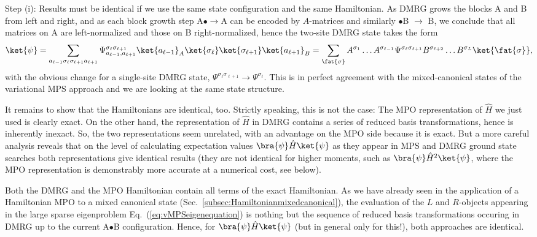 Step (i): Results must be identical if we use the same state configuration and the same Hamiltonian. As DMRG grows the blocks A and B from left and right, and as each block growth step A$\bullet \rightarrow$A can be encoded by $A$-matrices and similarly $\bullet$B $\rightarrow$ B, we conclude that all matrices on A are left-normalized and those on B right-normalized, hence the two-site DMRG state takes the form
\begin{equation}
\ket{\psi} = \sum_{a_{\ell-1} \sigma_\ell \sigma_{\ell+1} a_{\ell+1}} \Psi^{\sigma_\ell\sigma_{\ell+1}}_{a_{\ell-1}, a_{\ell+1}} \ket{a_{\ell-1}}_A \ket{\sigma_\ell} \ket{\sigma_{\ell+1}} \ket{a_{\ell+1}}_B = \sum_{\fat{\sigma}} A^{\sigma_1} \ldots A^{\sigma_{\ell-1}} 
\Psi^{\sigma_\ell \sigma_{\ell+1}} B^{\sigma_{\ell+2}} \ldots B^{\sigma_L} \ket{\fat{\sigma}},
\end{equation}
with the obvious change for a single-site DMRG state, $\Psi^{\sigma_\ell\sigma_{\ell+1}} \rightarrow \Psi^{\sigma_\ell}$. This is in perfect agreement with the mixed-canonical states of the variational MPS approach and we are looking at the same state structure. 

It remains to show that the Hamiltonians are identical, too. Strictly speaking, this is not the case: 
The MPO representation of $\hat{H}$ we just used is clearly exact. On the other hand, the representation of $\hat{H}$ in DMRG contains a series of reduced basis transformations, hence is inherently inexact. So, the two representations seem unrelated, with an advantage on the MPO side because it is exact. But a more careful analysis reveals that  on the level of calculating expectation values $\bra{\psi} \hat{H} \ket{\psi}$ as they appear in MPS and DMRG ground state searches both representations give identical results (they are not identical for higher moments, such as  $\bra{\psi} \hat{H}^2 \ket{\psi}$, where the MPO representation is demonstrably more accurate at a numerical cost, see below).

Both the DMRG and the MPO Hamiltonian contain all terms of the exact Hamiltonian. As we have already seen in the application of a Hamiltonian MPO to a mixed canonical state (Sec.~\ref{subsec:Hamiltonianmixedcanonical}), the evaluation of the $L$ and $R$-objects appearing in the large sparse eigenproblem Eq.~(\ref{eq:vMPSeigenequation}) is nothing but the sequence of reduced basis transformations occuring in DMRG up to the current A$\bullet$B configuration. Hence, for $\bra{\psi} \hat{H} \ket{\psi}$ (but in general only for this!), both approaches are identical.

